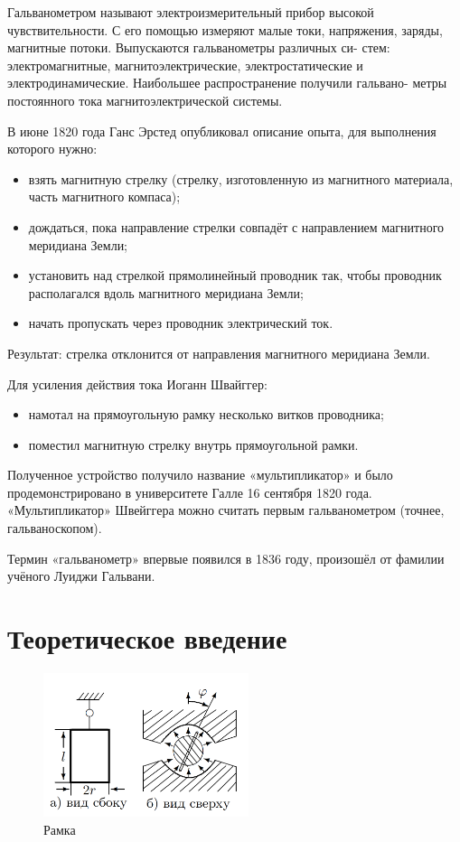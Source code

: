 \documentclass[12pt]{kiarticle}
\begin{document}
	Гальванометром называют электроизмерительный прибор высокой
	чувствительности. С его помощью измеряют малые токи, напряжения,
	заряды, магнитные потоки. Выпускаются гальванометры различных си-
	стем: электромагнитные, магнитоэлектрические, электростатические и
	электродинамические. Наибольшее распространение получили гальвано-
	метры постоянного тока магнитоэлектрической системы. 
	
	В июне 1820 года Ганс Эрстед опубликовал описание опыта, для выполнения которого нужно:
	
	\begin{itemize}
		\item взять магнитную стрелку (стрелку, изготовленную из магнитного материала, часть магнитного компаса);
		\item	дождаться, пока направление стрелки совпадёт с направлением магнитного меридиана Земли;
		\item	установить над стрелкой прямолинейный проводник так, чтобы проводник располагался вдоль магнитного меридиана Земли;
		\item	начать пропускать через проводник электрический ток.
	\end{itemize}

	Результат: стрелка отклонится от направления магнитного меридиана Земли.
	
	
	Для усиления действия тока Иоганн Швайггер:
	
	\begin{itemize}
		\item намотал на прямоугольную рамку несколько витков проводника;
		\item поместил магнитную стрелку внутрь прямоугольной рамки.
	\end{itemize}

	Полученное устройство получило название «мультипликатор» и было продемонстрировано в университете Галле 16 сентября 1820 года. «Мультипликатор» Швейггера можно считать первым гальванометром (точнее, гальваноскопом).
	
	Термин «гальванометр» впервые появился в 1836 году, произошёл от фамилии учёного Луиджи Гальвани.
	
	
	\section{Теоретическое введение}
	
	\begin{figure} 
		\includegraphics[width=6cm]{ramka}
		\caption{Рамка}
		\label{}
	\end{figure}
\end{document}
